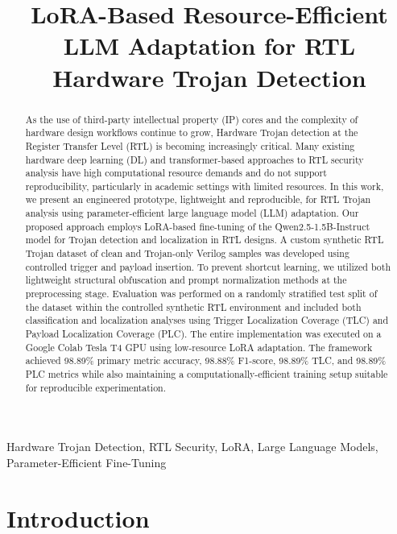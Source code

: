 \documentclass[conference]{IEEEtran}
\title{LoRA-Based Resource-Efficient LLM Adaptation for RTL Hardware Trojan Detection}
\author{
\IEEEauthorblockN{Debopam Sinha\IEEEauthorrefmark{1}}

\IEEEauthorblockA{\IEEEauthorrefmark{1}
Department of Electronics and Communication Engineering\\
PES University RR Campus, Bengaluru, India\\
debopamsinha120@gmail.com
}
}
\begin{document}
\maketitle


\begin{abstract}
As the use of third-party intellectual property (IP) cores and the complexity of hardware design workflows continue to grow, Hardware Trojan detection at the Register Transfer Level (RTL) is becoming increasingly critical. Many existing hardware deep learning (DL) and transformer-based approaches to RTL security analysis have high computational resource demands and do not support reproducibility, particularly in academic settings with limited resources. In this work, we present an engineered prototype, lightweight and reproducible, for RTL Trojan analysis using parameter-efficient large language model (LLM) adaptation. Our proposed approach employs LoRA-based fine-tuning of the Qwen2.5-1.5B-Instruct model for Trojan detection and localization in RTL designs. A custom synthetic RTL Trojan dataset of clean and Trojan-only Verilog samples was developed using controlled trigger and payload insertion. To prevent shortcut learning, we utilized both lightweight structural obfuscation and prompt normalization methods at the preprocessing stage. Evaluation was performed on a randomly stratified test split of the dataset within the controlled synthetic RTL environment and included both classification and localization analyses using Trigger Localization Coverage (TLC) and Payload Localization Coverage (PLC). The entire implementation was executed on a Google Colab Tesla T4 GPU using low-resource LoRA adaptation. The framework achieved 98.89\% primary metric accuracy, 98.88\% F1-score, 98.89\% TLC, and 98.89\% PLC metrics while also maintaining a computationally-efficient training setup suitable for reproducible experimentation.
\end{abstract}

\begin{IEEEkeywords}
Hardware Trojan Detection,
RTL Security,
LoRA,
Large Language Models,
Parameter-Efficient Fine-Tuning
\end{IEEEkeywords}

\section{Introduction}
\label{sec:introduction}
\end{document}
